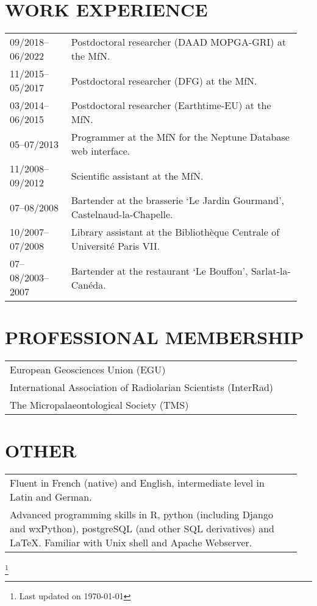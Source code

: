 \documentclass[11pt, a4paper]{article}
\begin{document}
\section{WORK EXPERIENCE}
\begin{longtable}{p{0.2\linewidth} P{0.75\linewidth}}
09/2018--06/2022 & Postdoctoral researcher (DAAD MOPGA-GRI) at the MfN.\\
11/2015--05/2017 & Postdoctoral researcher (DFG) at the MfN.\\
03/2014--06/2015 & Postdoctoral researcher (Earthtime-EU) at the MfN.\\
05--07/2013 & Programmer at the MfN for the Neptune Database web interface.\\
11/2008--09/2012 & Scientific assistant at the MfN.\\
07--08/2008 & Bartender at the brasserie `Le Jardin Gourmand', Castelnaud-la-Chapelle.\\
10/2007--07/2008 & Library assistant at the Biblioth\`{e}que Centrale of Universit\'{e} Paris VII.\\
07--08/2003--2007 & Bartender at the restaurant `Le Bouffon', Sarlat-la-Can\'{e}da.\\
\end{longtable}

\section{PROFESSIONAL MEMBERSHIP}
\begin{longtable}{p{0.94\linewidth} p{0.01\linewidth}}
European Geosciences Union (EGU) & \\
International Association of Radiolarian Scientists (InterRad) & \\
The Micropalaeontological Society (TMS) & \\
\end{longtable}

\section{OTHER}
\begin{longtable}{P{0.94\linewidth} p{0.01\linewidth}}
Fluent in French (native) and English, intermediate level in Latin and German. & \\
Advanced programming skills in R, python (including Django and wxPython), postgreSQL (and other SQL derivatives) and \LaTeX. Familiar with Unix shell and Apache Webserver. & \\
\end{longtable}

{\let\thefootnote\relax\footnote{Last updated on \today}}
\end{document}
